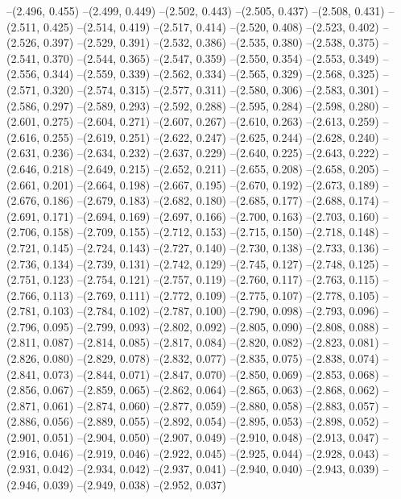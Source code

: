 {--(2.496, 0.455)
--(2.499, 0.449)
--(2.502, 0.443)
--(2.505, 0.437)
--(2.508, 0.431)
--(2.511, 0.425)
--(2.514, 0.419)
--(2.517, 0.414)
--(2.520, 0.408)
--(2.523, 0.402)
--(2.526, 0.397)
--(2.529, 0.391)
--(2.532, 0.386)
--(2.535, 0.380)
--(2.538, 0.375)
--(2.541, 0.370)
--(2.544, 0.365)
--(2.547, 0.359)
--(2.550, 0.354)
--(2.553, 0.349)
--(2.556, 0.344)
--(2.559, 0.339)
--(2.562, 0.334)
--(2.565, 0.329)
--(2.568, 0.325)
--(2.571, 0.320)
--(2.574, 0.315)
--(2.577, 0.311)
--(2.580, 0.306)
--(2.583, 0.301)
--(2.586, 0.297)
--(2.589, 0.293)
--(2.592, 0.288)
--(2.595, 0.284)
--(2.598, 0.280)
--(2.601, 0.275)
--(2.604, 0.271)
--(2.607, 0.267)
--(2.610, 0.263)
--(2.613, 0.259)
--(2.616, 0.255)
--(2.619, 0.251)
--(2.622, 0.247)
--(2.625, 0.244)
--(2.628, 0.240)
--(2.631, 0.236)
--(2.634, 0.232)
--(2.637, 0.229)
--(2.640, 0.225)
--(2.643, 0.222)
--(2.646, 0.218)
--(2.649, 0.215)
--(2.652, 0.211)
--(2.655, 0.208)
--(2.658, 0.205)
--(2.661, 0.201)
--(2.664, 0.198)
--(2.667, 0.195)
--(2.670, 0.192)
--(2.673, 0.189)
--(2.676, 0.186)
--(2.679, 0.183)
--(2.682, 0.180)
--(2.685, 0.177)
--(2.688, 0.174)
--(2.691, 0.171)
--(2.694, 0.169)
--(2.697, 0.166)
--(2.700, 0.163)
--(2.703, 0.160)
--(2.706, 0.158)
--(2.709, 0.155)
--(2.712, 0.153)
--(2.715, 0.150)
--(2.718, 0.148)
--(2.721, 0.145)
--(2.724, 0.143)
--(2.727, 0.140)
--(2.730, 0.138)
--(2.733, 0.136)
--(2.736, 0.134)
--(2.739, 0.131)
--(2.742, 0.129)
--(2.745, 0.127)
--(2.748, 0.125)
--(2.751, 0.123)
--(2.754, 0.121)
--(2.757, 0.119)
--(2.760, 0.117)
--(2.763, 0.115)
--(2.766, 0.113)
--(2.769, 0.111)
--(2.772, 0.109)
--(2.775, 0.107)
--(2.778, 0.105)
--(2.781, 0.103)
--(2.784, 0.102)
--(2.787, 0.100)
--(2.790, 0.098)
--(2.793, 0.096)
--(2.796, 0.095)
--(2.799, 0.093)
--(2.802, 0.092)
--(2.805, 0.090)
--(2.808, 0.088)
--(2.811, 0.087)
--(2.814, 0.085)
--(2.817, 0.084)
--(2.820, 0.082)
--(2.823, 0.081)
--(2.826, 0.080)
--(2.829, 0.078)
--(2.832, 0.077)
--(2.835, 0.075)
--(2.838, 0.074)
--(2.841, 0.073)
--(2.844, 0.071)
--(2.847, 0.070)
--(2.850, 0.069)
--(2.853, 0.068)
--(2.856, 0.067)
--(2.859, 0.065)
--(2.862, 0.064)
--(2.865, 0.063)
--(2.868, 0.062)
--(2.871, 0.061)
--(2.874, 0.060)
--(2.877, 0.059)
--(2.880, 0.058)
--(2.883, 0.057)
--(2.886, 0.056)
--(2.889, 0.055)
--(2.892, 0.054)
--(2.895, 0.053)
--(2.898, 0.052)
--(2.901, 0.051)
--(2.904, 0.050)
--(2.907, 0.049)
--(2.910, 0.048)
--(2.913, 0.047)
--(2.916, 0.046)
--(2.919, 0.046)
--(2.922, 0.045)
--(2.925, 0.044)
--(2.928, 0.043)
--(2.931, 0.042)
--(2.934, 0.042)
--(2.937, 0.041)
--(2.940, 0.040)
--(2.943, 0.039)
--(2.946, 0.039)
--(2.949, 0.038)
--(2.952, 0.037)
}
